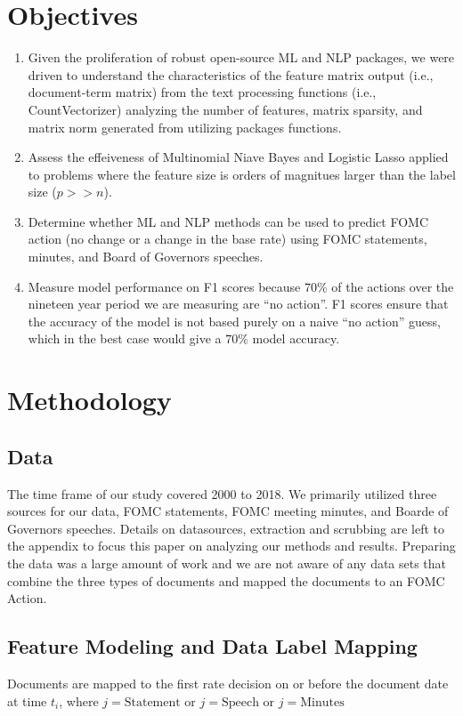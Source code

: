 \documentclass[11pt]{article}
\begin{document}
{\section{Objectives}
\begin{enumerate}
\item Given the proliferation of robust open-source ML and NLP packages, we were driven to understand the characteristics of the feature matrix output (i.e., document-term matrix) from the text processing functions (i.e., CountVectorizer) analyzing the number of features, matrix sparsity, and matrix norm generated from utilizing packages functions.
\item Assess the effeiveness of Multinomial Niave Bayes and Logistic Lasso applied to problems where the feature size is orders of magnitues larger than the label size ($p>>n$).
\item Determine whether ML and NLP methods can be used to predict FOMC action (no change or a change in the base rate) using FOMC statements, minutes, and Board of Governors speeches.
\item Measure model performance on F1 scores because $70\%$ of the actions over the nineteen year period we are measuring are ``no action''.  F1 scores ensure that the accuracy of the model is not based purely on a naive ``no action'' guess, which in the best case would give a $70\%$ model accuracy.
\end{enumerate}

\section{Methodology}

\subsection{Data}

The time frame of our study covered 2000 to 2018. We primarily utilized three sources for our data, FOMC statements, FOMC meeting minutes, and Boarde of Governors speeches. Details on datasources, extraction and scrubbing are left to the appendix to focus this paper on analyzing our methods and results.  Preparing the data was a large amount of work and we are not aware of any data sets that combine the three types of documents and mapped the documents to an FOMC Action.

\subsection{Feature Modeling and Data Label Mapping}
\noindent Documents are mapped to the first rate decision on or before the document date at time $t_i$, where $j=\text{Statement}$ or $j=\text{Speech}$ or $j=\text{Minutes}$

}
\end{document}
